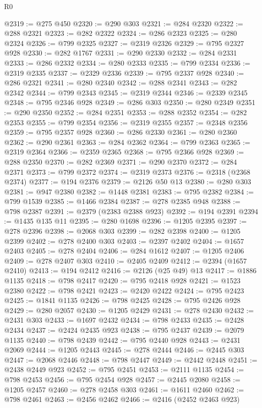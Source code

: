 \begin{lexlean}{R0}
\begin{coremodule}
@2319 := @275 @450
@2320 := @290 @303
@2321 := @284 @2320
@2322 := @288 @2321
@2323 := @282 @2322
@2324 := @286 @2323
@2325 := @280 @2324
@2326 := @799 @2325
@2327 := @2319 @2326
@2329 := @795 @2327 @928
@2330 := @282 @1767
@2331 := @290 @2330
@2332 := @284 @2331
@2333 := @286 @2332
@2334 := @280 @2333
@2335 := @799 @2334
@2336 := @2319 @2335
@2337 := @2329 @2336
@2339 := @795 @2337 @928
@2340 := @286 @2321
@2341 := @280 @2340
@2342 := @288 @2341
@2343 := @282 @2342
@2344 := @799 @2343
@2345 := @2319 @2344
@2346 := @2339 @2345
@2348 := @795 @2346 @928
@2349 := @286 @303
@2350 := @280 @2349
@2351 := @290 @2350
@2352 := @284 @2351
@2353 := @288 @2352
@2354 := @282 @2353
@2355 := @799 @2354
@2356 := @2319 @2355
@2357 := @2348 @2356
@2359 := @795 @2357 @928
@2360 := @286 @2330
@2361 := @280 @2360
@2362 := @290 @2361
@2363 := @284 @2362
@2364 := @799 @2363
@2365 := @2319 @2364
@2366 := @2359 @2365
@2368 := @795 @2366 @928
@2369 := @288 @2350
@2370 := @282 @2369
@2371 := @290 @2370
@2372 := @284 @2371
@2373 := @799 @2372
@2374 := @2319 @2373
@2376 := @2318 (@2368 @2374)
@2377 := @194 @2376
@2379 := @2126 @50 @13
@2380 := @280 @303
@2381 := @947 @2380
@2382 := @1448 @2381
@2383 := @795 @2382
@2384 := @799 @1539
@2385 := @1466 @2384
@2387 := @278 @2385 @948
@2388 := @798 @2387
@2391 := @2379 (@2383 @2388 @923)
@2392 := @194 @2391
@2394 := @1435 @135 @11
@2395 := @280 @1698
@2396 := @1205 @2395
@2397 := @278 @2396
@2398 := @2068 @303
@2399 := @282 @2398
@2400 := @1205 @2399
@2402 := @278 @2400 @303
@2403 := @2397 @2402
@2404 := @1657 @2403
@2405 := @278 @2404
@2406 := @284 @1612
@2407 := @1205 @2406
@2409 := @278 @2407 @303
@2410 := @2405 @2409
@2412 := @2394 (@1657 @2410)
@2413 := @194 @2412
@2416 := @2126 (@25 @49) @13
@2417 := @1886 @1135
@2418 := @798 @2417
@2420 := @795 @2418 @928
@2421 := @1523 @2380
@2422 := @798 @2421
@2423 := @2420 @2422
@2424 := @795 @2423
@2425 := @1841 @1135
@2426 := @798 @2425
@2428 := @795 @2426 @928
@2429 := @280 @2057
@2430 := @1205 @2429
@2431 := @278 @2430
@2432 := @2431 @303
@2433 := @1697 @2432
@2434 := @798 @2433
@2435 := @2428 @2434
@2437 := @2424 @2435 @923
@2438 := @795 @2437
@2439 := @2079 @1135
@2440 := @798 @2439
@2442 := @795 @2440 @928
@2443 := @2431 @2069
@2444 := @1205 @2443
@2445 := @278 @2444
@2446 := @2445 @303
@2447 := @2068 @2446
@2448 := @798 @2447
@2449 := @2442 @2448
@2451 := @2438 @2449 @923
@2452 := @795 @2451
@2453 := @2111 @1135
@2454 := @798 @2453
@2456 := @795 @2454 @928
@2457 := @2445 @2080
@2458 := @1205 @2457
@2460 := @278 @2458 @303
@2461 := @1611 @2460
@2462 := @798 @2461
@2463 := @2456 @2462
@2466 := @2416 (@2452 @2463 @923)

\end{coremodule}
\end{lexlean}
